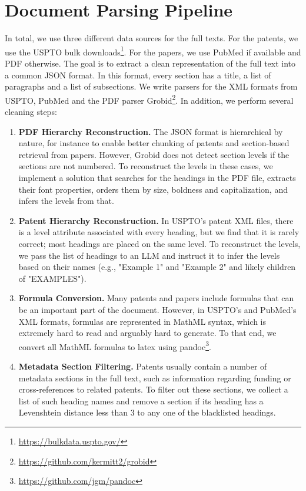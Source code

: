 \appendix




\FloatBarrier
\section{Document Parsing Pipeline}\label{sec:parsing_appendix}
\FloatBarrier

In total, we use three different data sources for the full texts.
For the patents, we use the USPTO bulk downloads\footnote{\url{https://bulkdata.uspto.gov/}}.
For the papers, we use PubMed if available and PDF otherwise.
The goal is to extract a clean representation of the full text into a common JSON format.
In this format, every section has a title, a list of paragraphs and a list of subsections.
We write parsers for the XML formats from USPTO, PubMed and the PDF parser Grobid\footnote{\url{https://github.com/kermitt2/grobid}}.
In addition, we perform several cleaning steps:\begin{enumerate}
  \item \textbf{PDF Hierarchy Reconstruction. } The JSON format is hierarchical by nature,  for instance to enable better chunking of patents and section-based retrieval from papers. However, Grobid does not detect section levels if the sections are not numbered. To reconstruct the levels in these cases, we implement a solution that searches for the headings in the PDF file, extracts their font properties, orders them by size, boldness and capitalization, and infers the levels from that.
  \item \textbf{Patent Hierarchy Reconstruction. } In USPTO's patent XML files, there is a level attribute associated with every heading, but we find that it is rarely correct; most headings are placed on the same level. To reconstruct the levels, we pass the list of headings to an LLM and instruct it to infer the levels based on their names (e.g., "Example 1" and "Example 2" and likely children of "EXAMPLES").
  \item \textbf{Formula Conversion. } Many patents and papers include formulas that can be an important part of the document. However, in USPTO's and PubMed's XML formats, formulas are represented in MathML syntax, which is extremely hard to read and arguably hard to generate. To that end, we convert all MathML formulas to latex using pandoc\footnote{\url{https://github.com/jgm/pandoc}}.
  \item \textbf{Metadata Section Filtering. } Patents usually contain a number of metadata sections in the full text, such as information regarding funding or cross-references to related patents. To filter out these sections, we collect a list of such heading names and remove a section if its heading has a Levenshtein distance less than 3 to any one of the blacklisted headings.
\end{enumerate}



